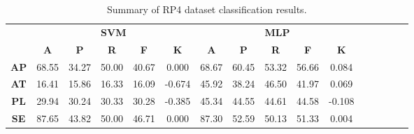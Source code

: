 \begin{landscape}
\begin{table}[htbp]
\footnotesize
\centering
\caption{Summary of RP4 dataset classification results.}
\label{tab:base_female}
\begin{tabular}{|c|c|c|c|c|c|c|c|c|c|c|c|c|c|c|c|}
\hline
\multirow{2}{*}{}	& \multicolumn{5}{c|}{\textbf{SVM}}												& \multicolumn{5}{c|}{\textbf{MLP}}												\\ \cline{2-11} 
					& \textbf{A}	& \textbf{P}	& \textbf{R}	& \textbf{F}	& \textbf{K}	& \textbf{A}	& \textbf{P}	& \textbf{R}	& \textbf{F}	& \textbf{K}	\\ \hline
\textbf{AP}			& 68.55			& 34.27			& 50.00			& 40.67			& 0.000			& 68.67			& 60.45			& 53.32			& 56.66			& 0.084			\\ \hline
\textbf{AT}			& 16.41			& 15.86			& 16.33			& 16.09			& -0.674			& 45.92			& 38.24			& 46.50			& 41.97			& 0.069			\\ \hline
\textbf{PL}			& 29.94			& 30.24			& 30.33			& 30.28			& -0.385			& 45.34			& 44.55			& 44.61			& 44.58			& -0.108			\\ \hline
\textbf{SE}			& 87.65			& 43.82			& 50.00			& 46.71			& 0.000			& 87.30			& 52.59			& 50.13			& 51.33			& 0.004			\\ \hline
\end{tabular}
\end{table}
\end{landscape}